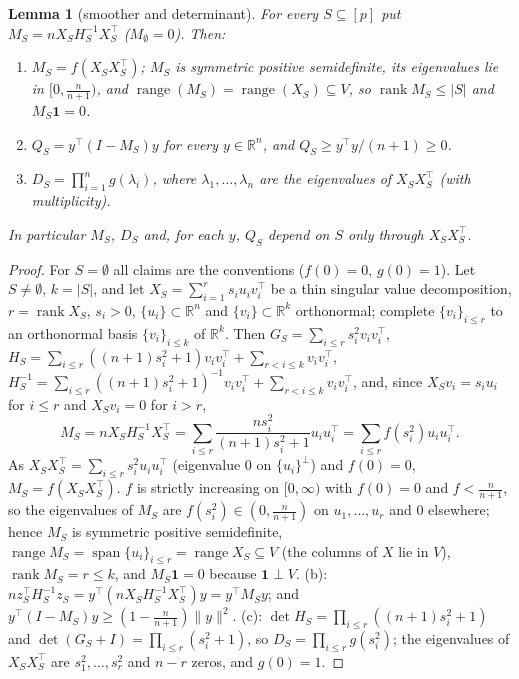 \documentclass[11pt]{article}
\newtheorem{lemma}[theorem]{Lemma}
\theoremstyle{remark}
\newcommand{\R}{\mathbb R}
\newcommand{\one}{\mathbf 1}
\DeclareMathOperator{\rank}{rank}
\DeclareMathOperator{\spn}{span}
\begin{document}
\begin{lemma}[smoother and determinant]\label{lem:smoother}
For every $S\subseteq[p]$ put $M_S=n X_SH_S^{-1}X_S^\top$ ($M_\emptyset=0$). Then:
\begin{enumerate}
\item[(a)] $M_S=f(X_SX_S^\top)$; $M_S$ is symmetric positive semidefinite, its eigenvalues lie in $[0,\tfrac n{n+1})$, and $\operatorname{range}(M_S)=\operatorname{range}(X_S)\subseteq V$, so $\rank M_S\le|S|$ and $M_S\one=0$.
\item[(b)] $Q_S=y^\top(I-M_S)y$ for every $y\in\R^n$, and $Q_S\ge y^\top y/(n+1)\ge0$.
\item[(c)] $D_S=\prod_{i=1}^ng(\lambda_i)$, where $\lambda_1,\dots,\lambda_n$ are the eigenvalues of $X_SX_S^\top$ (with multiplicity).
\end{enumerate}
In particular $M_S$, $D_S$ and, for each $y$, $Q_S$ depend on $S$ only through $X_SX_S^\top$.
\end{lemma}
\begin{proof}
For $S=\emptyset$ all claims are the conventions ($f(0)=0$, $g(0)=1$). Let $S\ne\emptyset$, $k=|S|$, and let $X_S=\sum_{i=1}^r s_iu_iv_i^\top$ be a thin singular value decomposition, $r=\rank X_S$, $s_i>0$, $\{u_i\}\subset\R^n$ and $\{v_i\}\subset\R^k$ orthonormal; complete $\{v_i\}_{i\le r}$ to an orthonormal basis $\{v_i\}_{i\le k}$ of $\R^k$. Then $G_S=\sum_{i\le r}s_i^2v_iv_i^\top$, $H_S=\sum_{i\le r}((n+1)s_i^2+1)v_iv_i^\top+\sum_{r<i\le k}v_iv_i^\top$, $H_S^{-1}=\sum_{i\le r}((n+1)s_i^2+1)^{-1}v_iv_i^\top+\sum_{r<i\le k}v_iv_i^\top$, and, since $X_Sv_i=s_iu_i$ for $i\le r$ and $X_Sv_i=0$ for $i>r$,
\[
M_S=nX_SH_S^{-1}X_S^\top=\sum_{i\le r}\frac{ns_i^2}{(n+1)s_i^2+1}u_iu_i^\top=\sum_{i\le r}f(s_i^2)u_iu_i^\top .
\]
As $X_SX_S^\top=\sum_{i\le r}s_i^2u_iu_i^\top$ (eigenvalue $0$ on $\{u_i\}^\perp$) and $f(0)=0$, $M_S=f(X_SX_S^\top)$. $f$ is strictly increasing on $[0,\infty)$ with $f(0)=0$ and $f<\tfrac n{n+1}$, so the eigenvalues of $M_S$ are $f(s_i^2)\in(0,\tfrac n{n+1})$ on $u_1,\dots,u_r$ and $0$ elsewhere; hence $M_S$ is symmetric positive semidefinite, $\operatorname{range}M_S=\spn\{u_i\}_{i\le r}=\operatorname{range}X_S\subseteq V$ (the columns of $X$ lie in $V$), $\rank M_S=r\le k$, and $M_S\one=0$ because $\one\perp V$. (b): $n z_S^\top H_S^{-1}z_S=y^\top(nX_SH_S^{-1}X_S^\top)y=y^\top M_Sy$; and $y^\top(I-M_S)y\ge(1-\tfrac n{n+1})\|y\|^2$. (c): $\det H_S=\prod_{i\le r}((n+1)s_i^2+1)$ and $\det(G_S+I)=\prod_{i\le r}(s_i^2+1)$, so $D_S=\prod_{i\le r}g(s_i^2)$; the eigenvalues of $X_SX_S^\top$ are $s_1^2,\dots,s_r^2$ and $n-r$ zeros, and $g(0)=1$.
\end{proof}
\end{document}
